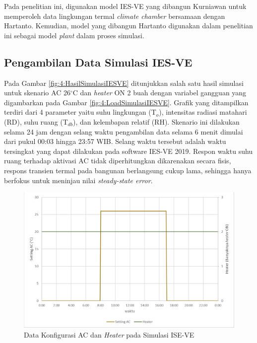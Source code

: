 Pada penelitian ini, digunakan model IES-VE yang dibangun Kurniawan untuk memperoleh data lingkungan termal \textit{climate chamber} bersamaan dengan Hartanto. Kemudian, model yang dibangun Hartanto digunakan dalam penelitian ini sebagai model \textit{plant} dalam proses simulasi.

\subsection{Pengambilan Data Simulasi IES-VE}

Pada Gambar \ref{fig:4:HasilSimulasiIESVE} ditunjukkan salah satu hasil simulasi untuk skenario AC 26$^\circ$C dan \textit{heater} ON 2 buah dengan variabel gangguan yang digambarkan pada Gambar \ref{fig:4:LoadSimulasiIESVE}. Grafik yang ditampilkan terdiri dari 4 parameter yaitu suhu lingkungan (T$_o$), intensitas radiasi matahari (RD), suhu ruang (T$_{db}$), dan kelembapan relatif (RH). Skenario ini dilakukan selama 24 jam dengan selang waktu pengambilan data selama 6 menit dimulai dari pukul 00:03 hingga 23:57 WIB. Selang waktu tersebut adalah waktu tersingkat yang dapat dilakukan pada software IES-VE 2019. Respon waktu suhu ruang terhadap aktivasi AC tidak diperhitungkan dikarenakan secara fisis, respons transien termal pada bangunan berlangsung cukup lama, sehingga hanya berfokus untuk meninjau nilai \textit{steady-state error}.

\begin{figure}[!h]
	\centering
	\includegraphics[width=1\textwidth]{figures/ACHTSimulasiIESVE}
	\caption{Data Konfigurasi AC dan \textit{Heater} pada Simulasi ISE-VE}
	\label{fig:4:ACHTSimulasiIESVE}
\end{figure}
\vspace{1em}

